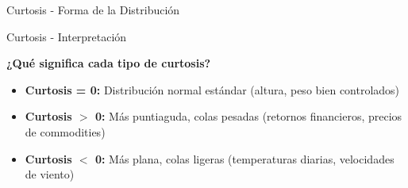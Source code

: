 \documentclass{beamer}
\begin{document}
\begin{frame}{Curtosis - Forma de la Distribución}
    \begin{center}
        \hspace{-1cm}
    \end{center}
\end{frame}

\begin{frame}{Curtosis - Interpretación}
    \begin{center}
        \textbf{¿Qué significa cada tipo de curtosis?}
    \end{center}
    
    \vspace{0.5cm}
    
    \begin{itemize}
        \item<1->[{\makebox[1em][c]{\textcolor{black}{\faBell}}}] \textbf{Curtosis = 0:} Distribución normal estándar (altura, peso bien controlados)
        \item<2->[{\makebox[1em][c]{\textcolor{black}{\faExclamationTriangle}}}] \textbf{Curtosis $>$ 0:} Más puntiaguda, colas pesadas (retornos financieros, precios de commodities)
        \item<3->[{\makebox[1em][c]{\textcolor{black}{\faMinus}}}] \textbf{Curtosis $<$ 0:} Más plana, colas ligeras (temperaturas diarias, velocidades de viento)
    \end{itemize}
    
\end{frame}
\end{document}
